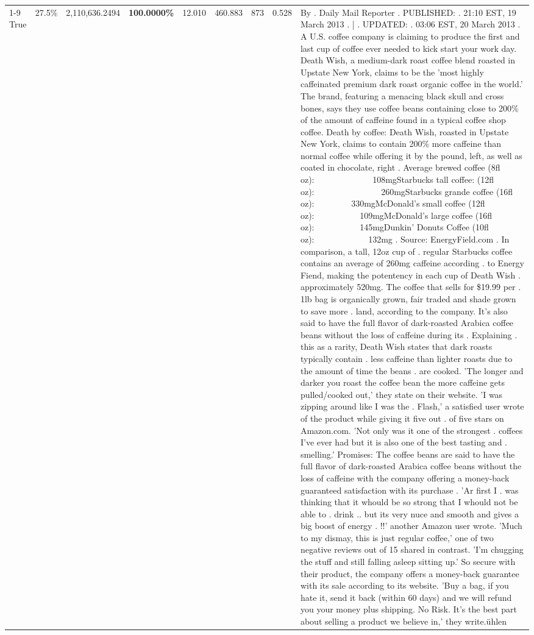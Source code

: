 \begin{table}[H]
{\begin{tabular}{lllrlllll}
\cline{1-9}
True & 27.5\% & 2,110,636.2494 & \bfseries \color{red} 100.0000\% & 12.010 & 460.883 & 873 & 0.528 & By . Daily Mail Reporter . PUBLISHED: . 21:10 EST, 19 March 2013 . | . UPDATED: . 03:06 EST, 20 March 2013 . A U.S. coffee company is claiming to produce the first and last cup of coffee ever needed to kick start your work day. Death Wish, a medium-dark roast coffee blend roasted in Upstate New York, claims to be the 'most highly caffeinated premium dark roast organic coffee in the world.' The brand, featuring a menacing black skull and cross bones, says they use coffee beans containing close to 200\% of the amount of caffeine found in a typical coffee shop coffee. Death by coffee: Death Wish, roasted in Upstate New York, claims to contain 200\% more caffeine than normal coffee while offering it by the pound, left, as well as coated in chocolate, right . Average brewed coffee (8fl oz):              108mgStarbucks tall coffee: (12fl oz):                260mgStarbucks grande coffee (16fl oz):         330mgMcDonald's small coffee (12fl oz):           109mgMcDonald's large coffee (16fl oz):           145mgDunkin' Donuts Coffee (10fl oz):             132mg . Source: EnergyField.com . In comparison, a tall, 12oz cup of . regular Starbucks coffee contains an average of 260mg caffeine according . to Energy Fiend, making the potentency in each cup of Death Wish . approximately 520mg. The coffee that sells for \$19.99 per . 1lb bag is organically grown, fair traded and shade grown to save more . land, according to the company. It's also said to have the full flavor of dark-roasted Arabica coffee beans without the loss of caffeine during its . Explaining . this as a rarity, Death Wish states that dark roasts typically contain . less caffeine than lighter roasts due to the amount of time the beans . are cooked. 'The longer and darker you roast the coffee bean the more caffeine gets pulled/cooked out,' they state on their website. 'I was zipping around like I was the . Flash,' a satisfied user wrote of the product while giving it five out . of five stars on Amazon.com. 'Not only was it one of the strongest . coffees I've ever had but it is also one of the best tasting and . smelling.’ Promises: The coffee beans are said to have the full flavor of dark-roasted Arabica coffee beans without the loss of caffeine with the company offering a money-back guaranteed satisfaction with its purchase . 'Ar first I . was thinking that it whould be so strong that I whould not be able to . drink .. but its very nuce and smooth and gives a big boost of energy . !!' another Amazon user wrote. 'Much to my dismay, this is just regular coffee,' one of two negative reviews out of 15 shared in contrast. 'I'm chugging the stuff and still falling asleep sitting up.' So secure with their product, the company offers a money-back guarantee with its sale according to its website. 'Buy a bag, if you hate it, send it back (within 60 days) and we will refund you your money plus shipping. No Risk. It’s the best part about selling a product we believe in,' they write.ühlen \\

\end{tabular}}
\end{table}
